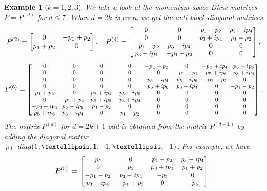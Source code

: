 \documentclass[english]{ourlematema}
\numberwithin{theorem}{section}
\newtheorem{example}[theorem]{Example}
\theoremstyle{definition}
\begin{document}
\begin{example}[$k = 1,2,3$]  \label{ex:Pmatrix}
    We take a look at the momentum space Dirac matrices $P = P^{(d)}$ for
    $d \leq 7$.
           When $d=2k$ is even, we get the anti-block diagonal matrices 
    $$
         P^{(2)} = \begin{bmatrix}
        0 & -p_1+p_2\\
        p_1+p_2 & 0
    \end{bmatrix}, \quad  P^{(4)} = 
    \begin{small} \begin{bmatrix}
        0 & 0 & p_1-p_2 & p_3-ip_4 \\
        0 & 0 & p_3+ip_4 & p_1+p_2\\
        -p_1-p_2 &  p_3-ip_4 & 0 & 0\\
        p_3+ip_4 & -p_1+p_2 & 0 & 0
    \end{bmatrix}, \end{small}
    $$
        $$
    P^{(6)} = \begin{footnotesize} \begin{bmatrix}
        0 & 0 & 0 & 0 &\! \!\!-p_1+p_2 & 0 & \!\!\! -p_3+ip_4 &\!\! p_5-ip_6\\
        0 & 0 & 0 & 0 & 0 & \!\! -p_1+p_2 & p_5+ip_6 & \!\!p_3+ip_4\\
        0 & 0 & 0 & 0 &\!\!\!\!\! -p_3-ip_4 & p_5-ip_6 &\!\!\! -p_1-p_2 & 0\\
        0 & 0 & 0 & 0 & p_5+ip_6 & p_3-ip_4 & 0 & \!\!\! \!\! -p_1-p_2\\
        p_1+p_2 & 0 & \!\!\!\!\! -p_3+ip_4 & p_5-ip_6 & 0 & 0 & 0 & 0\\
        0 & p_1+p_2 &\! p_5+ip_6 & p_3+ip_4 & 0 & 0 & 0 & 0\\ 
        -p_3-ip_4 & \!\!\! p_5-ip_6 & p_1-p_2 & 0 & 0 & 0 & 0 & 0\\ 
        p_5+ip_6 &\!\!\! p_3-ip_4 & 0 & p_1-p_2 & 0 & 0 & 0 & 0
    \end{bmatrix}. \end{footnotesize}
    $$
The matrix $P^{(d)}$ for $d = 2k + 1$ odd is obtained from the matrix $P^{(d - 1)}$ by adding 
the diagonal matrix $\,p_{d}\cdot {\rm diag}(1, \dots, 1, - 1, \dots, -1)$. For example, we have
    $$
    P^{(5)} \,=\, \begin{small} \begin{bmatrix}
        p_5 & 0 & p_1-p_2 & p_3-ip_4 \\
        0 & p_5 & p_3+ip_4 & p_1+p_2\\
        -p_1-p_2 &  p_3-ip_4 & -p_5 & 0\\
        p_3+ip_4 & -p_1+p_2 & 0 & -p_5
    \end{bmatrix}. \end{small}
    $$
\end{example}
\end{document}
